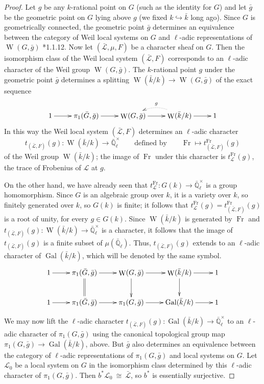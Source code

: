 \documentclass[11pt]{amsart}
\theoremstyle{plain}
\theoremstyle{definition}
\theoremstyle{remark}
\newcommand{\EE}{\mathbb{\bar Q}_\ell}
\newcommand{\bFq}{\bar{k}}
\newcommand{\Fq}{k}
\newcommand{\EEx}{\EE^\times}
\DeclareMathOperator{\Gal}{Gal}
\DeclareMathOperator{\Weil}{W}
\newcommand{\Frob}{{\operatorname{Fr}}}
\newcommand{\iso}{{\ \cong\ }}
\newcommand{\cs}[1]{{\mathcal{#1}}}
\newcommand{\gcs}[1]{{\mathcal{\bar #1}}}
\newcommand{\bg}{\bar{g}}
\newcommand{\bG}{\bar{G}}
\begin{document}
\begin{proof}
  Let $g$ be any $\Fq$-rational point on $G$ (such as the identity for
  $G$) and let $\bg$ be the geometric point on $G$ lying above
  $g$ (we fixed $\Fq \hookrightarrow \bFq$ long ago). Since $G$ is
  geometrically connected, the geometric point $\bg$ determines
  an equivalence between the category of Weil local systems on $G$ and
  $\ell$-adic representations of $\Weil(G,\bg)$
  \cite{Deligne:Weil2}*{1.1.12}. Now let $(\gcs{L},\mu,F)$ be a
  character sheaf on $G$. Then the isomorphism class of the Weil local
  system $(\gcs{L},F)$ corresponds to an $\ell$-adic character of the
  Weil group $\Weil(G, \bg)$. The $\Fq$-rational point $g$ under
  the geometric point $\bg$ determines a splitting
  $\Weil(\bFq/\Fq)\to \Weil(G,\bg)$ of the exact sequence
  \[
  \xymatrix{
    1 \ar[r] & \pi_1(\bG, \bg) \ar[r] &  \Weil(G,\bg) \ar[r]
    & \ar@/_1pc/@{.>}[l]_{g} \Weil(\bFq/\Fq) \ar[r] & 1
    }
  \]
  In this way the Weil local system $(\gcs{L},F)$ determines an $\ell$-adic character
  \[
  t_{(\gcs{L},F)}(g) : \Weil(\bFq/\Fq) \to \EEx \qquad \text{defined by}\qquad \Frob \mapsto t^\Frob_{(\gcs{L},F)}(g)
  \]
  of the Weil group $\Weil(\bFq/\Fq)$; the image of $\Frob$ under this
  character is $t^\Frob_\cs{L}(g)$, the trace of Frobenius of $\cs{L}$ at $g$.

  On the other hand, we have already seen that $t^\Frob_\cs{L} : G(\Fq) \to \EEx$
  is a group homomorphism. Since $G$ is an algebraic group over $\Fq$, it is a
  variety over $\Fq$, so finitely generated over $\Fq$, so $G(\Fq)$ is finite;
  it follows that $t^\Frob_\cs{L}(g) = t^\Frob_{(\gcs{L},F)}(g)$ is a root of unity,
  for every $g\in G(\Fq)$.  Since $\Weil(\bFq/\Fq)$ is generated by
  $\Frob$ and $t_{(\gcs{L},F)}(g) : \Weil(\bFq/\Fq) \to \EEx$ is
  a character, it follows that the image of $t_{(\gcs{L},F)}(g)$ is a
  finite subset of $\mu(\EE)$. Thus, $t_{(\gcs{L},F)}(g)$ extends to
  an $\ell$-adic character of $\Gal(\bFq/\Fq)$, which will be denoted
  by the same symbol.
  \[
  \xymatrix{
    1 \ar[r] & \ar@{=}[d] \pi_1(\bG, \bg) \ar[r] & \ar[d] \Weil(G,\bg) \ar[r] & \ar[d]  \Weil(\bFq/\Fq) \ar[r] & 1\\
    1 \ar[r] &  \pi_1(\bG, \bg) \ar[r] & \pi_1(G,\bg) \ar[r] & \Gal(\bFq/\Fq) \ar[r] & 1\\
    }
  \]

  We may now lift the $\ell$-adic character $t_{(\gcs{L},F)}(g) : \Gal(\bFq/\Fq) \to \EEx$
  to an $\ell$-adic character of $\pi_1(G,\bg)$ using the canonical topological group map
  $\pi_1(G,\bg) \to \Gal(\bFq/\Fq)$, above. But $\bg$ also
  determines an equivalence between the category of $\ell$-adic
  representations of $\pi_1(G,\bg)$ and local systems on $G$. Let
  $\cs{L}_0$ be a local system on $G$ in the isomorphism class
  determined by this $\ell$-adic character of $\pi_1(G,\bg)$.
  Then $b^*\cs{L}_0 \iso \gcs{L}$, so $b^*$ is essentially surjective.


\end{proof}
\end{document}
